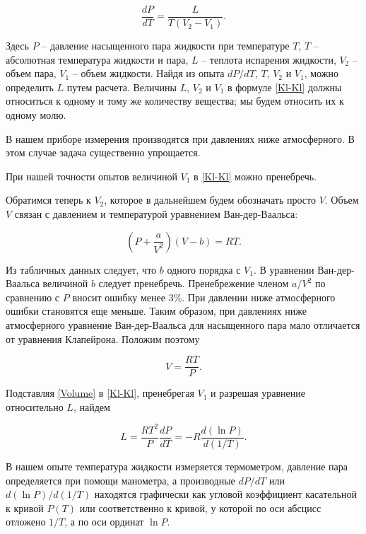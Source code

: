 \documentclass[12pt,a4paper]{article}
\begin{document}
	\begin{equation}\label{Kl-Kl}
		\frac{dP}{dT}=\frac{L}{T\left(V_2-V_1\right)}.
	\end{equation}
	
	Здесь $ P $ -- давление насыщенного пара жидкости при температуре $ T $, $ T $ -- абсолютная температура жидкости и пара, $ L $ -- теплота испарения жидкости, $ V_2 $ -- объем пара, $ V_1 $ -- объем жидкости. Найдя из опыта $ dP/dT $, $ T $, $ V_2 $ и $ V_1 $, можно определить $ L $ путем расчета. Величины $ L $, $ V_2 $ и $ V_1 $ в формуле \eqref{Kl-Kl} должны относиться к одному и тому же количеству вещества; мы будем относить их к одному молю.
	
	В нашем приборе измерения производятся при давлениях ниже атмосферного. В этом случае задача существенно упрощается.
	
	При нашей точности опытов величиной $ V_1 $ в \eqref{Kl-Kl} можно пренебречь.
	
	Обратимся теперь к $ V_2 $, которое в дальнейшем будем обозначать просто $ V $. Объем $ V $ связан с давлением и температурой уравнением Ван-дер-Ваальса:
	
	\begin{equation}\label{VDV}
		\left(P+\frac{a}{V^2}\right)\left(V-b\right)=RT.
	\end{equation}
	
	Из табличных данных следует, что $ b $ одного порядка с $ V_1 $. В уравнении Ван-дер-Ваальса величиной $ b $ следует пренебречь. Пренебрежение членом $ a/V^2 $ по сравнению с $ P $ вносит ошибку менее 3\%. При давлении ниже атмосферного ошибки становятся еще меньше. Таким образом, при давлениях ниже атмосферного уравнение Ван-дер-Ваальса для насыщенного пара мало отличается от уравнения Клапейрона. Положим поэтому
	
	\begin{equation}\label{Volume}
		V=\frac{RT}{P}.
	\end{equation}
	
	Подставляя \eqref{Volume} в \eqref{Kl-Kl}, пренебрегая $ V_1 $ и разрешая уравнение относительно $ L $, найдем
	
	\begin{equation}\label{final}
		L=\frac{RT^2}{P}\frac{dP}{dT}=-R\frac{d(\ln P)}{d(1/T)}.
	\end{equation}
	
	В нашем опыте температура жидкости измеряется термометром, давление пара определяется при помощи манометра, а производные $ dP/dT $ или $ d(\ln P)/d(1/T) $ находятся графически как угловой коэффициент касательной к кривой $ P(T) $ или соответственно к кривой, у которой по оси абсцисс отложено $ 1/T $, а по оси ординат $ \ln P $.
	
\end{document}

